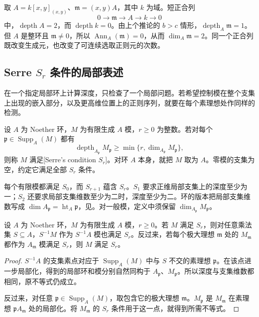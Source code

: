 \begin{example}\label{g5:exm:depth-maximal-ideal}
	取 \(A=k[x,y]_{(x,y)}\)、\(\mathfrak m=(x,y)A\)，其中 \(k\) 为域。短正合列
	\[
		0\longrightarrow\mathfrak m\longrightarrow A\longrightarrow k\longrightarrow0
	\]
	中，\(\operatorname{depth}A=2\)，而 \(\operatorname{depth}k=0\)。由上个推论的 \(b>c\) 情形，\(\operatorname{depth}_A\mathfrak m=1\)。但 \(A\) 是整环且 \(\mathfrak m\ne0\)，所以 \(\operatorname{Ann}_A(\mathfrak m)=0\)，从而 \(\dim_A\mathfrak m=2\)。同一个正合列既改变生成元，也改变了可连续选取正则元的次数。
\end{example}

\subsection{\texorpdfstring{Serre \(S_r\) 条件的局部表述}{Serre Sᵣ 条件的局部表述}}
\label{g5:subsec:0803:05}

在一个指定局部环上计算深度，只检查了一个局部问题。若希望控制模在整个支集上出现的嵌入部分，以及更高维位置上的正则序列，就要在每个素理想处作同样的检测。

\begin{definition}\label{g5:def:serre-module-condition}
	设 \(A\) 为 Noether 环，\(M\) 为有限生成 \(A\) 模，\(r\geq0\) 为整数。若对每个 \(\mathfrak p\in\operatorname{Supp}_A(M)\) 都有
	\[
		\operatorname{depth}_{A_{\mathfrak p}}M_{\mathfrak p}
		\geq\min\{r,\dim_{A_{\mathfrak p}}M_{\mathfrak p}\},
	\]
	则称 \(M\) 满足[Serre's condition \(S_r\)]。对环 \(A\) 本身，就把 \(M\) 取为 \(A\)。零模的支集为空，约定它满足全部 \(S_r\) 条件。
\end{definition}

每个有限模都满足 \(S_0\)，而 \(S_{r+1}\) 蕴含 \(S_r\)。\(S_1\) 要求正维局部支集上的深度至少为一；\(S_2\) 还要求局部支集维数至少为二时，深度至少为二。环的版本把局部支集维数写成 \(\dim A_{\mathfrak p}=\operatorname{ht}_A\mathfrak p\)，见\cite[第23节，第183页]{Matsumura1989}。对一般模，定义中须保留 \(\dim_{A_{\mathfrak p}}M_{\mathfrak p}\)。

\begin{proposition}\label{g5:prop:serre-localization}
	设 \(A\) 为 Noether 环，\(M\) 为有限生成 \(A\) 模，\(r\geq0\)。若 \(M\) 满足 \(S_r\)，则对任意乘法集 \(S\subseteq A\)，\(S^{-1}M\) 作为 \(S^{-1}A\) 模也满足 \(S_r\)。反过来，若每个极大理想 \(\mathfrak m\) 处的 \(M_{\mathfrak m}\) 都作为 \(A_{\mathfrak m}\) 模满足 \(S_r\)，则 \(M\) 满足 \(S_r\)。
\end{proposition}
\begin{proof}
	\(S^{-1}A\) 的支集素点对应于 \(\operatorname{Supp}_A(M)\) 中与 \(S\) 不交的素理想 \(\mathfrak p\)。在该点进一步局部化，得到的局部环和模分别自然同构于 \(A_{\mathfrak p}\)、\(M_{\mathfrak p}\)。所以深度与支集维数都相同，原不等式仍成立。

	反过来，对任意 \(\mathfrak p\in\operatorname{Supp}_A(M)\)，取包含它的极大理想 \(\mathfrak m\)。\(M_{\mathfrak p}\) 是 \(M_{\mathfrak m}\) 在素理想 \(\mathfrak pA_{\mathfrak m}\) 处的局部化。将 \(M_{\mathfrak m}\) 的 \(S_r\) 条件用于这一点，就得到所需不等式。
\end{proof}

